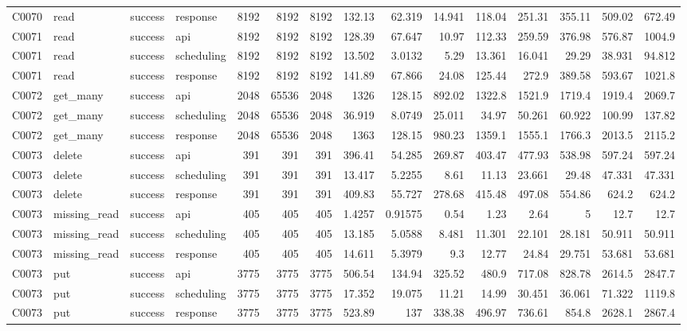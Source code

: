 \begin{landscape}
\begin{longtable}{llllrrrrrrrrrrr}
C0070 & read & success & response & 8192 & 8192 & 8192 & 132.13 & 62.319 & 14.941 & 118.04 & 251.31 & 355.11 & 509.02 & 672.49\\
C0071 & read & success & api & 8192 & 8192 & 8192 & 128.39 & 67.647 & 10.97 & 112.33 & 259.59 & 376.98 & 576.87 & 1004.9\\
C0071 & read & success & scheduling & 8192 & 8192 & 8192 & 13.502 & 3.0132 & 5.29 & 13.361 & 16.041 & 29.29 & 38.931 & 94.812\\
C0071 & read & success & response & 8192 & 8192 & 8192 & 141.89 & 67.866 & 24.08 & 125.44 & 272.9 & 389.58 & 593.67 & 1021.8\\
C0072 & get\_\allowbreak{}many & success & api & 2048 & 65536 & 2048 & 1326 & 128.15 & 892.02 & 1322.8 & 1521.9 & 1719.4 & 1919.4 & 2069.7\\
C0072 & get\_\allowbreak{}many & success & scheduling & 2048 & 65536 & 2048 & 36.919 & 8.0749 & 25.011 & 34.97 & 50.261 & 60.922 & 100.99 & 137.82\\
C0072 & get\_\allowbreak{}many & success & response & 2048 & 65536 & 2048 & 1363 & 128.15 & 980.23 & 1359.1 & 1555.1 & 1766.3 & 2013.5 & 2115.2\\
C0073 & delete & success & api & 391 & 391 & 391 & 396.41 & 54.285 & 269.87 & 403.47 & 477.93 & 538.98 & 597.24 & 597.24\\
C0073 & delete & success & scheduling & 391 & 391 & 391 & 13.417 & 5.2255 & 8.61 & 11.13 & 23.661 & 29.48 & 47.331 & 47.331\\
C0073 & delete & success & response & 391 & 391 & 391 & 409.83 & 55.727 & 278.68 & 415.48 & 497.08 & 554.86 & 624.2 & 624.2\\
C0073 & missing\_\allowbreak{}read & success & api & 405 & 405 & 405 & 1.4257 & 0.91575 & 0.54 & 1.23 & 2.64 & 5 & 12.7 & 12.7\\
C0073 & missing\_\allowbreak{}read & success & scheduling & 405 & 405 & 405 & 13.185 & 5.0588 & 8.481 & 11.301 & 22.101 & 28.181 & 50.911 & 50.911\\
C0073 & missing\_\allowbreak{}read & success & response & 405 & 405 & 405 & 14.611 & 5.3979 & 9.3 & 12.77 & 24.84 & 29.751 & 53.681 & 53.681\\
C0073 & put & success & api & 3775 & 3775 & 3775 & 506.54 & 134.94 & 325.52 & 480.9 & 717.08 & 828.78 & 2614.5 & 2847.7\\
C0073 & put & success & scheduling & 3775 & 3775 & 3775 & 17.352 & 19.075 & 11.21 & 14.99 & 30.451 & 36.061 & 71.322 & 1119.8\\
C0073 & put & success & response & 3775 & 3775 & 3775 & 523.89 & 137 & 338.38 & 496.97 & 736.61 & 854.8 & 2628.1 & 2867.4\\

\end{longtable}
\end{landscape}

